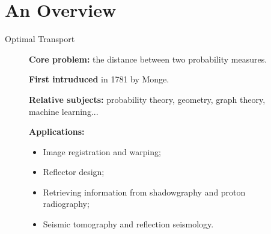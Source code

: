 \section{An Overview}

\begin{frame}{Optimal Transport}
    \scriptsize
    \vspace{-1.5em}
    \begin{figure}
        \captionsetup{font=tiny}
        \begin{minipage}[t]{0.6\linewidth}
            \vspace{0pt}
            \textbf{Core problem:} the distance between two probability measures.

            \textbf{First intruduced} in 1781 by Monge.

            \textbf{Relative subjects:} probability theory, geometry, graph theory, machine learning...

            \textbf{Applications:}
            \begin{itemize}
                \item Image registration and warping;
                \item Reflector design;
                \item Retrieving information from shadowgraphy and proton radiography;
                \item Seismic tomography and reflection seismology.
            \end{itemize}


\end{minipage}
\end{figure}
\end{frame}
